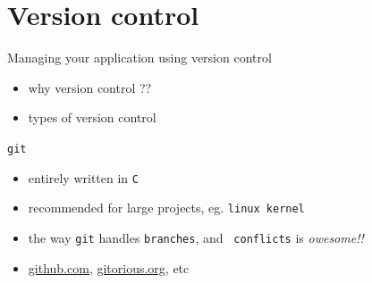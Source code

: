 \documentclass{beamer}
\begin{document}


 \section{Version control}
 \begin{frame}{Managing your application using version control}
   \begin{itemize}
   \item why version control ??
   \item types of version control 
   \end{itemize}

   \begin{block}{{\tt git}}
     \begin{itemize}
     \item entirely written in {\tt C}
     \item recommended for large projects, eg. {\tt linux kernel}
     \item the way {\tt git} handles {\tt branches}, and {\tt
       conflicts} is {\em owesome!!}
     \item {\url{github.com}}, {\url{gitorious.org}}, etc
     \end{itemize}
   \end{block}
 \end{frame}
\end{document}
